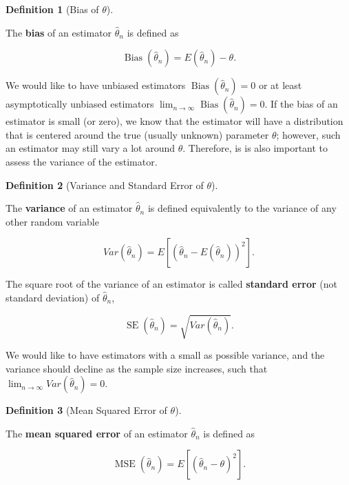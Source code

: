 \documentclass[
  letterpaper,
  DIV=11,
  numbers=noendperiod]{scrreprt}
\theoremstyle{definition}
\newtheorem{definition}{Definition}[chapter]
\theoremstyle{plain}
\theoremstyle{plain}
\theoremstyle{remark}
\begin{document}
\leavevmode{}%
\begin{definition}[Bias of \(\theta\)]\label{def-bias}

The \textbf{bias} of an estimator \(\hat\theta_n\) is defined as

\[
\operatorname{Bias}\left(\hat\theta_n\right) = E\left(\hat\theta_n\right) - \theta.
\]

\end{definition}

We would like to have unbiased estimators
\(\operatorname{Bias}\left(\hat\theta_n\right)=0\) or at least
asymptotically unbiased estimators
\(\lim_{n\to\infty}\operatorname{Bias}\left(\hat\theta_n\right)=0\). If
the bias of an estimator is small (or zero), we know that the estimator
will have a distribution that is centered around the true (usually
unknown) parameter \(\theta\); however, such an estimator may still vary
a lot around \(\theta\). Therefore, is is also important to assess the
variance of the estimator.

\leavevmode{}%
\begin{definition}[Variance and Standard Error of
\(\theta\)]\label{def-var}

The \textbf{variance} of an estimator \(\hat\theta_n\) is defined
equivalently to the variance of any other random variable

\[
Var\left(\hat\theta_n\right) = E\left[\left(\hat\theta_n - E(\hat\theta_n)\right)^2\right].
\]

The square root of the variance of an estimator is called
\textbf{standard error} (not standard deviation) of \(\hat\theta_n\),

\[
\operatorname{SE}\left(\hat\theta_n\right) = \sqrt{Var\left(\hat\theta_n\right)}.
\]

\end{definition}

We would like to have estimators with a small as possible variance, and
the variance should decline as the sample size increases, such that
\(\lim_{n\to\infty}Var\left(\hat\theta_n\right)=0\).

\leavevmode{}%
\begin{definition}[Mean Squared Error of \(\theta\)]\label{def-mse}

The \textbf{mean squared error} of an estimator \(\hat\theta_n\) is
defined as

\[
\operatorname{MSE}\left(\hat\theta_n\right) =  E\left[\left(\hat\theta_n - \theta\right)^2\right].
\]

\end{definition}
\end{document}
